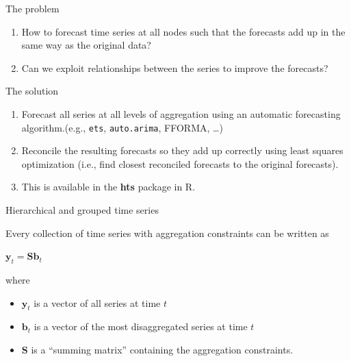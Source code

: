 \documentclass[14pt,ignorenonframetext,]{beamer}
\providecommand{\tightlist}{%
  \setlength{\itemsep}{0pt}\setlength{\parskip}{0pt}}
\def\by{\bm{y}}
\def\bS{\bm{S}}
\begin{document}
\begin{frame}[fragile]{The problem}
\protect\hypertarget{the-problem}{}

\fontsize{13}{14}\sf

\begin{alertblock}{}
\begin{enumerate}\tightlist
 \item How to forecast time series at all nodes such that the forecasts add up in the same way as the original data?
 \item Can we exploit relationships between the series to improve the forecasts?
\end{enumerate}
\end{alertblock}\pause

\begin{block}{The solution}

\begin{enumerate}
\tightlist
\item
  Forecast all series at all levels of aggregation using an automatic
  forecasting algorithm.\newline (e.g., \texttt{ets},
  \texttt{auto.arima}, FFORMA, \ldots{})
\item
  Reconcile the resulting forecasts so they add up correctly using least
  squares optimization (i.e., find closest reconciled forecasts to the
  original forecasts).
\item
  This is available in the \textbf{hts} package in R.
\end{enumerate}

\end{block}

\end{frame}

\begin{frame}{Hierarchical and grouped time series}
\protect\hypertarget{hierarchical-and-grouped-time-series}{}

Every collection of time series with aggregation constraints can be
written as

\begin{block}{}
\centerline{$\by_{t}=\bS\bm{b}_{t}$}
\end{block}

where

\begin{itemize}
\tightlist
\item
  \(\by_t\) is a vector of all series at time \(t\)
\item
  \(\bm{b}_t\) is a vector of the most disaggregated series at time
  \(t\)
\item
  \(\bS\) is a ``summing matrix'' containing the aggregation
  constraints.
\end{itemize}

\end{frame}
\end{document}
